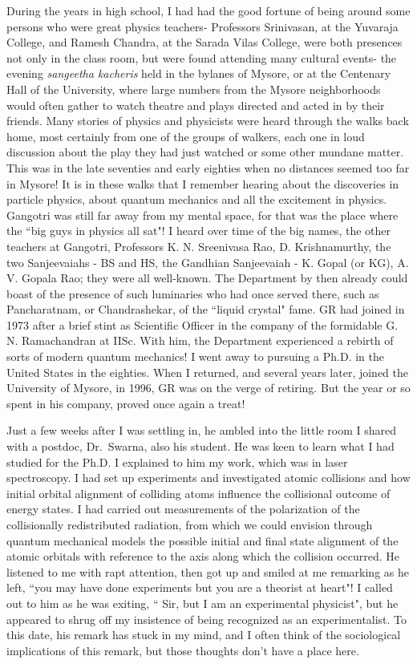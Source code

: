 During the years in high school, I had had the good fortune of being around some persons who were great physics teachers- Professors Srinivasan, at the Yuvaraja College, and Ramesh Chandra, at the Sarada Vilas College, were both presences not only in the class room, but were found attending many cultural events- the evening \textit{sangeetha kacheris} held in the bylanes of Mysore, or at the Centenary Hall of the University, where large numbers from the Mysore neighborhoods would often gather to watch theatre and plays directed and acted in by their friends. Many stories of physics and physicists were heard through the walks back home, most certainly from one of the groups of walkers, each one in loud discussion about the play they had just watched or some other mundane matter. This was in the late seventies and early eighties when no distances seemed too far in Mysore!  It is in these walks that I remember hearing about the discoveries in particle physics, about quantum mechanics and all the excitement in physics. Gangotri was still far away from my mental space, for that was the place where the ``big guys in physics all sat"! I heard over time of the big names, the other teachers at Gangotri, Professors K. N. Sreenivasa Rao, D. Krishnamurthy, the two Sanjeevaiahs - BS and HS, the Gandhian Sanjeevaiah - K. Gopal (or KG), A. V. Gopala Rao;  they were all well-known. The Department by then already could boast of the presence of such luminaries who had once served there, such as Pancharatnam, or Chandrashekar, of the ``liquid crystal" fame. GR had joined in 1973 after a brief stint as Scientific Officer in the company of the formidable G. N. Ramachandran at IISc. With him, the Department experienced a rebirth of sorts of modern quantum mechanics!  I went away to pursuing a Ph.D. in the United States in the eighties. When I returned, and several years later, joined the University of Mysore, in 1996, GR was on the verge of retiring. But the year or so spent in his company, proved once again a treat!

Just a few weeks after I was settling in, he ambled into the little room I shared with a postdoc, Dr.\ Swarna, also his student. He was keen to learn what I had studied for the Ph.D. I explained to him my work, which was in laser spectroscopy. I had set up experiments and investigated atomic collisions and how initial orbital alignment of colliding atoms influence the collisional outcome of energy states. I had carried out measurements of the polarization of the collisionally redistributed radiation, from which we could envision through quantum mechanical models the possible initial and final state alignment of the atomic orbitals with reference to the axis along which the collision occurred. He listened to me with rapt attention, then got up and smiled at me remarking as he left, ``you may have done experiments but you are a theorist at heart"!  I called out to him as he was exiting, `` Sir, but I am an experimental physicist", but he appeared to shrug off my insistence of being recognized as an experimentalist. To this date, his remark has stuck in my mind, and I often think of the sociological implications of this remark, but those thoughts don't have a place here.

